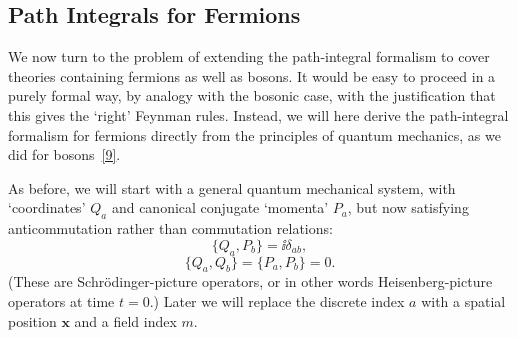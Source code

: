 
\subsection{Path Integrals for Fermions}

We now turn to the problem of extending the path-integral formalism to cover
theories containing fermions as well as bosons. It would be easy to proceed in
a purely formal way, by analogy with the bosonic case, with the justification
that this gives the `right' Feynman rules. Instead, we will here derive the
path-integral formalism for fermions directly from the principles of quantum
mechanics, as we did for bosons~\hyperref[ref:9.9]{[9]}.

As before, we will start with a general quantum mechanical system, with
`coordinates' $Q_a$ and canonical conjugate `momenta' $P_a$, but now satisfying
anticommutation rather than commutation relations:
\begin{equation}
\{Q_a,P_b\}=\ii\delta_{ab},
\tag{9.5.1}\label{eq:9.5.1}
\end{equation}
\begin{equation}
\{Q_a,Q_b\}=\{P_a,P_b\}=0.
\tag{9.5.2}\label{eq:9.5.2}
\end{equation}
(These are Schrödinger-picture operators, or in other words
Heisenberg-picture operators at time $t=0$.) Later we will replace the discrete
index $a$ with a spatial position $\mathbf{x}$ and a field index $m$.

